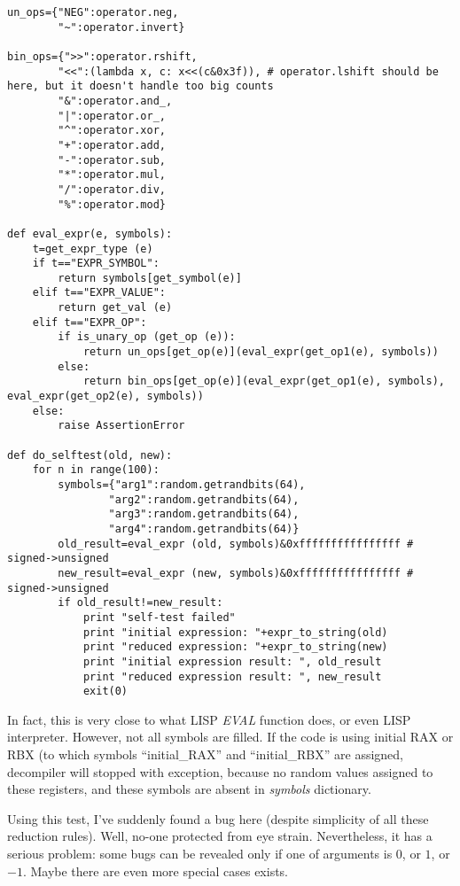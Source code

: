 ﻿\documentclass[12pt]{article}
\begin{document}
\begin{lstlisting}
un_ops={"NEG":operator.neg,
        "~":operator.invert}

bin_ops={">>":operator.rshift,
        "<<":(lambda x, c: x<<(c&0x3f)), # operator.lshift should be here, but it doesn't handle too big counts
        "&":operator.and_,
        "|":operator.or_,
        "^":operator.xor,
        "+":operator.add,
        "-":operator.sub,
        "*":operator.mul,
        "/":operator.div,
        "%":operator.mod}

def eval_expr(e, symbols):
    t=get_expr_type (e)
    if t=="EXPR_SYMBOL":
        return symbols[get_symbol(e)]
    elif t=="EXPR_VALUE":
        return get_val (e)
    elif t=="EXPR_OP":
        if is_unary_op (get_op (e)):
            return un_ops[get_op(e)](eval_expr(get_op1(e), symbols))
        else:
            return bin_ops[get_op(e)](eval_expr(get_op1(e), symbols), eval_expr(get_op2(e), symbols))
    else:
        raise AssertionError

def do_selftest(old, new):
    for n in range(100):
        symbols={"arg1":random.getrandbits(64), 
                "arg2":random.getrandbits(64), 
                "arg3":random.getrandbits(64), 
                "arg4":random.getrandbits(64)}
        old_result=eval_expr (old, symbols)&0xffffffffffffffff # signed->unsigned
        new_result=eval_expr (new, symbols)&0xffffffffffffffff # signed->unsigned
        if old_result!=new_result:
            print "self-test failed"
            print "initial expression: "+expr_to_string(old)
            print "reduced expression: "+expr_to_string(new)
            print "initial expression result: ", old_result
            print "reduced expression result: ", new_result
            exit(0)
\end{lstlisting}

In fact, this is very close to what LISP \textit{EVAL} function does, or even LISP interpreter.
However, not all symbols are filled.
If the code is using initial RAX or RBX (to which symbols ``initial\_RAX'' and ``initial\_RBX'' are assigned,
decompiler will stopped with exception, because no random values assigned to these registers,
and these symbols are absent in \textit{symbols} dictionary.

Using this test, I've suddenly found a bug here (despite simplicity of all these reduction rules).
Well, no-one protected from eye strain.
Nevertheless, it has a serious problem: some bugs can be revealed only if one of arguments is $0$, or $1$, or $-1$.
Maybe there are even more special cases exists.
\end{document}
